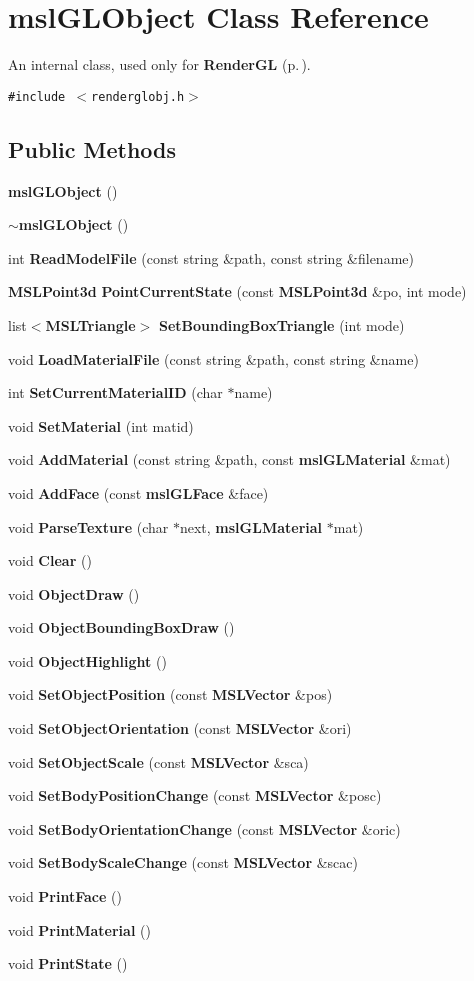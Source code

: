 \section{msl\-GLObject  Class Reference}
\label{class_mslGLObject}
An internal class, used only for {\bf Render\-GL} {\rm (p.\,\pageref{class_RenderGL})}. 


{\tt \#include $<$renderglobj.h$>$}

\subsection*{Public Methods}
\begin{CompactItemize}
\item 
{\bf msl\-GLObject} ()
\item 
{\bf $\sim$msl\-GLObject} ()
\item 
int {\bf Read\-Model\-File} (const string \&path, const string \&filename)
\item 
{\bf MSLPoint3d} {\bf Point\-Current\-State} (const {\bf MSLPoint3d} \&po, int mode)
\item 
list$<${\bf MSLTriangle}$>$ {\bf Set\-Bounding\-Box\-Triangle} (int mode)
\item 
void {\bf Load\-Material\-File} (const string \&path, const string \&name)
\item 
int {\bf Set\-Current\-Material\-ID} (char $\ast$name)
\item 
void {\bf Set\-Material} (int matid)
\item 
void {\bf Add\-Material} (const string \&path, const {\bf msl\-GLMaterial} \&mat)
\item 
void {\bf Add\-Face} (const {\bf msl\-GLFace} \&face)
\item 
void {\bf Parse\-Texture} (char $\ast$next, {\bf msl\-GLMaterial} $\ast$mat)
\item 
void {\bf Clear} ()
\item 
void {\bf Object\-Draw} ()
\item 
void {\bf Object\-Bounding\-Box\-Draw} ()
\item 
void {\bf Object\-Highlight} ()
\item 
void {\bf Set\-Object\-Position} (const {\bf MSLVector} \&pos)
\item 
void {\bf Set\-Object\-Orientation} (const {\bf MSLVector} \&ori)
\item 
void {\bf Set\-Object\-Scale} (const {\bf MSLVector} \&sca)
\item 
void {\bf Set\-Body\-Position\-Change} (const {\bf MSLVector} \&posc)
\item 
void {\bf Set\-Body\-Orientation\-Change} (const {\bf MSLVector} \&oric)
\item 
void {\bf Set\-Body\-Scale\-Change} (const {\bf MSLVector} \&scac)
\item 
void {\bf Print\-Face} ()
\item 
void {\bf Print\-Material} ()
\item 
void {\bf Print\-State} ()
\end{CompactItemize}
